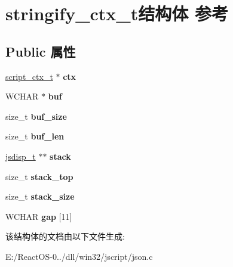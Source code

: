 \hypertarget{structstringify__ctx__t}{}\section{stringify\+\_\+ctx\+\_\+t结构体 参考}
\label{structstringify__ctx__t}
\subsection*{Public 属性}
\begin{DoxyCompactItemize}
\item 
\mbox{\label{structstringify__ctx__t_a37393c3a8bcc5ea5f61f5a8a3762170e}} 
\hyperlink{struct__script__ctx__t}{script\+\_\+ctx\+\_\+t} $\ast$ {\bfseries ctx}
\item 
\mbox{\label{structstringify__ctx__t_a680e69d19c5c56368f3758bfed999b87}} 
W\+C\+H\+AR $\ast$ {\bfseries buf}
\item 
\mbox{\label{structstringify__ctx__t_a0cdae8364e24961703ebec60c6d285da}} 
size\+\_\+t {\bfseries buf\+\_\+size}
\item 
\mbox{\label{structstringify__ctx__t_a77e119ca51d0b16417a3fe7ee945e740}} 
size\+\_\+t {\bfseries buf\+\_\+len}
\item 
\mbox{\label{structstringify__ctx__t_acff0ee0471092fa694b1cf9174e544cd}} 
\hyperlink{structjsdisp__t}{jsdisp\+\_\+t} $\ast$$\ast$ {\bfseries stack}
\item 
\mbox{\label{structstringify__ctx__t_a6467f32ac53181820c56be008d765062}} 
size\+\_\+t {\bfseries stack\+\_\+top}
\item 
\mbox{\label{structstringify__ctx__t_a15023a755bd25a75a2e7d14cf3cb61e6}} 
size\+\_\+t {\bfseries stack\+\_\+size}
\item 
\mbox{\label{structstringify__ctx__t_a5be357f929bb79685f6dd360363b5c92}} 
W\+C\+H\+AR {\bfseries gap} \mbox{[}11\mbox{]}
\end{DoxyCompactItemize}


该结构体的文档由以下文件生成\+:\begin{DoxyCompactItemize}
\item 
E\+:/\+React\+O\+S-\/0../dll/win32/jscript/json.\+c\end{DoxyCompactItemize}
